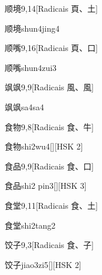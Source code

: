 \begin{entry}{顺境}{9,14}[Radicais ⾴、⼟]
  \begin{phonetics}{顺境}{shun4jing4}
  \end{phonetics}
\end{entry}

\begin{entry}{顺嘴}{9,16}[Radicais ⾴、⼝]
  \begin{phonetics}{顺嘴}{shun4zui3}
  \end{phonetics}
\end{entry}

\begin{entry}{飒飒}{9,9}[Radicais ⾵、⾵]
  \begin{phonetics}{飒飒}{sa4sa4}
  \end{phonetics}
\end{entry}

\begin{entry}{食物}{9,8}[Radicais ⾷、⽜]
  \begin{phonetics}{食物}{shi2wu4}[][HSK 2]
  \end{phonetics}
\end{entry}

\begin{entry}{食品}{9,9}[Radicais ⾷、⼝]
  \begin{phonetics}{食品}{shi2 pin3}[][HSK 3]
  \end{phonetics}
\end{entry}

\begin{entry}{食堂}{9,11}[Radicais ⾷、⼟]
  \begin{phonetics}{食堂}{shi2tang2}
  \end{phonetics}
\end{entry}

\begin{entry}{饺子}{9,3}[Radicais ⾷、⼦]
  \begin{phonetics}{饺子}{jiao3zi5}[][HSK 2]
  \end{phonetics}
\end{entry}

